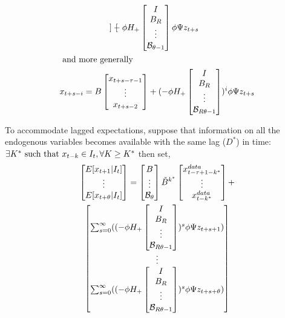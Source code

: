 \documentclass{elsart}
\begin{document}
\begin{prf}
\begin{gather}
\begin{bmatrix}
  \end{bmatrix}  -\phi H_+\begin{bmatrix}
I\\B_R\\\vdots\\\mathcal{B}_{\theta-1}
  \end{bmatrix} \phi\Psi z_{t+s}\\ \intertext{ and more generally}
x_{t+s-i} = B \begin{bmatrix}
    x_{t+s-\tau-1}\\\vdots\\x_{t+s-2} 
  \end{bmatrix} +  (-\phi H_+\begin{bmatrix}
I\\B_R\\\vdots\\\mathcal{B}_{R\theta-1}
  \end{bmatrix})^{i} \phi\Psi z_{t+s}
\end{gather}




To accommodate lagged expectations,
suppose that information on all the endogenous variables becomes available with
the same lag ($D^\ast$) in time: 
$\exists K^\ast \text{ such that } x_{t-k} \in I_t, \forall K \ge K^\ast\\$ then set,
\begin{gather}
    \begin{bmatrix}
    E [x_{t+1} |I_t] \\
\vdots \\
    E [x_{t+\theta}|I_t]
  \end{bmatrix}  =
\begin{bmatrix}
      B\\\vdots\\\mathcal{B}_{\theta}
    \end{bmatrix}
 \tilde{B}^{k^\ast}
  \begin{bmatrix}
    x^{data}_{t-\tau+1-k^\ast}\\
\vdots \\ 
   x^{data}_{t-k^\ast}
  \end{bmatrix} +\\
  \begin{bmatrix}
\sum_{s=0}^\infty  (  (-\phi H_+\begin{bmatrix}
I\\B_R\\\vdots\\\mathcal{B}_{R\theta-1}
  \end{bmatrix})^{s} \phi\Psi z_{t+s+1})\\
  \vdots\\
\sum_{s=0}^\infty  (  (-\phi H_+\begin{bmatrix}
I\\B_R\\\vdots\\\mathcal{B}_{R\theta-1}
  \end{bmatrix})^{s} \phi\Psi z_{t+s+\theta})
  \end{bmatrix}
\end{gather}



\end{prf}
\end{document}
